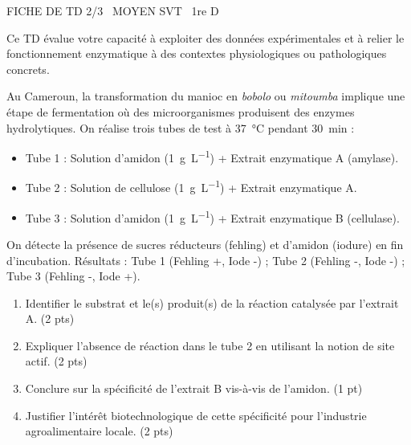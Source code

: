 \documentclass[11pt]{article}
\begin{document}
\begin{tcolorbox}[enhanced,colback=popink,colframe=popink,arc=10pt,boxrule=0pt,left=12pt,right=12pt,top=9pt,bottom=9pt]
{\color{white}\popxbold\small FICHE DE TD 2/3 \textbullet\ MOYEN \hfill SVT \textbullet\ 1re D\par}
\end{tcolorbox}
\vspace{4pt}
Ce TD évalue votre capacité à exploiter des données expérimentales et à relier le fonctionnement enzymatique à des contextes physiologiques ou pathologiques concrets.

\begin{exercice}
Au Cameroun, la transformation du manioc en \textit{bobolo} ou \textit{mitoumba} implique une étape de fermentation où des microorganismes produisent des enzymes hydrolytiques. On réalise trois tubes de test à \SI{37}{\celsius} pendant \SI{30}{\minute} :
\begin{itemize}
    \item Tube 1 : Solution d'amidon (\SI{1}{\gram\per\liter}) + Extrait enzymatique A (amylase).
    \item Tube 2 : Solution de cellulose (\SI{1}{\gram\per\liter}) + Extrait enzymatique A.
    \item Tube 3 : Solution d'amidon (\SI{1}{\gram\per\liter}) + Extrait enzymatique B (cellulase).
\end{itemize}
On détecte la présence de sucres réducteurs (fehling) et d'amidon (iodure) en fin d'incubation. Résultats : Tube 1 (Fehling +, Iode -) ; Tube 2 (Fehling -, Iode -) ; Tube 3 (Fehling -, Iode +).
\begin{enumerate}
    \item Identifier le substrat et le(s) produit(s) de la réaction catalysée par l'extrait A. (2 pts)
    \item Expliquer l'absence de réaction dans le tube 2 en utilisant la notion de site actif. (2 pts)
    \item Conclure sur la spécificité de l'extrait B vis-à-vis de l'amidon. (1 pt)
    \item Justifier l'intérêt biotechnologique de cette spécificité pour l'industrie agroalimentaire locale. (2 pts)
\end{enumerate}
\end{exercice}
\end{document}

